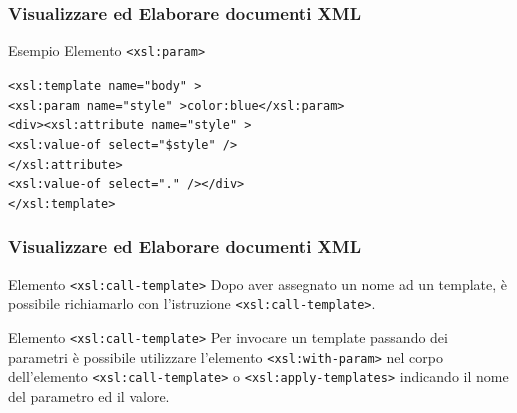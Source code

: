 \begin{frame}
    \frametitle{Visualizzare ed Elaborare documenti XML}
    \addtocounter{nframe}{1}
    

     \begin{block}{Esempio Elemento \texttt{<xsl:param>}}
        
        \texttt{<xsl:template name="body" >}
        \\\texttt{<xsl:param name="style" >color:blue</xsl:param>}
        \\\texttt{<div><xsl:attribute name="style" >}
        \\\texttt{<xsl:value-of select="\$style" />}
        \\\texttt{</xsl:attribute>}
        \\\texttt{<xsl:value-of select="." /></div>}
        \\\texttt{</xsl:template>}

     \end{block}
\end{frame}

\begin{frame}
    \frametitle{Visualizzare ed Elaborare documenti XML}
    \addtocounter{nframe}{1}
    

     \begin{block}{Elemento \texttt{<xsl:call-template>}}
        Dopo aver assegnato un nome ad un template, è possibile richiamarlo con l’istruzione \texttt{<xsl:call-template>}.
     \end{block}

     \begin{block}{Elemento \texttt{<xsl:call-template>}}
        Per invocare un template passando dei parametri è possibile utilizzare l’elemento \texttt{<xsl:with-param>} nel corpo dell’elemento \texttt{<xsl:call-template>} o \texttt{<xsl:apply-templates>} indicando il nome del parametro ed il valore.
     \end{block}

\end{frame}

